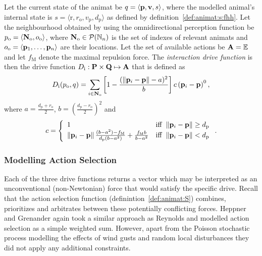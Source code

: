 \begin{defn}
\label{def:animat:Di:fhh}
Let the current state of the animat be $q=\langle{\ensuremath{\mathbf{p}}},{\mathbf{v}},s\rangle$, where the modelled animal's internal state is $s=\langle\mathrm{r},r_\mathrm{o},v_\mathrm{p},d_\mathrm{p}\rangle$ as defined by definition~\ref{def:animat:s:fhh}. Let the neighbourhood obtained by using the omnidirectional perception function be $p_\mathrm{o}=\langle{\ensuremath{\mathbf{N}}}_\mathrm{o},o_\mathrm{o}\rangle$, where ${\mathbf{N}}_\mathrm{o} \in {\ensuremath{\mathcal{P}(\mathbb{N}_n)}}$ is the set of indexes of relevant animats and $o_\mathrm{o}=\langle{\ensuremath{\mathbf{p}}}_1,\ldots,{\mathbf{p}}_n\rangle$ are their locations. Let the set of available actions be ${\mathbf{A}}=\mathbb{E}$ and let $f_\mathrm{M}$ denote the maximal repulsion force. The \emph{interaction drive function} is then the drive function $D_\mathrm{i}: {\mathbf{P}} \times {\ensuremath{\mathbf{Q}}} \mapsto {\ensuremath{\mathbf{A}}}$ that is defined as 
\begin{equation}
D_\mathrm{i}(p_\mathrm{o}, q) = \sum_{i \in {\ensuremath{\mathbf{N}}}_\mathrm{o}} \left[1-\frac{(\left\|{\mathbf{p}}_i-{\mathbf{p}}\right\|-a)^2}{b}\right] c \left({\mathbf{p}}_i-{\mathbf{p}}\right)^0, \label{eq:animat:Di:fhh}
\end{equation}
where $a=\frac{d_\mathrm{p}+r_\mathrm{o}}{2}$, $b=\left(\frac{d_\mathrm{p}-r_\mathrm{o}}{2}\right)^2$ and 
\begin{equation}
c = \left\{
\begin{array}{ll}
1 & \mathrm{iff}\ \left\|{\mathbf{p}}_i-{\mathbf{p}}\right\| \geq d_\mathrm{p} \\
\left\|{\mathbf{p}}_i-{\mathbf{p}}\right\|\frac{(b-a^2)-f_\mathrm{M}}{d_\mathrm{p}(b-a^2)}+\frac{f_\mathrm{M}b}{b-a^2} & \mathrm{iff}\ \left\|{\mathbf{p}}_i-{\mathbf{p}}\right\| < d_\mathrm{p}
\end{array}
\right..
\end{equation}
\end{defn}

\subsubsection{Modelling Action Selection}
Each of the three drive functions returns a vector which may be interpreted as an unconventional (non-Newtonian) \cite{heppner:1990} force that would satisfy the specific drive. Recall that the action selection function (definintion~\ref{def:animat:S}) combines, prioritizes and arbitrates between these potentially conflicting forces. Heppner and Grenander again took a similar approach as Reynolds and modelled action selection as a simple weighted sum. However, apart from the Poisson stochastic process modelling the effects of wind gusts and random local disturbances they did not apply any additional constraints.

